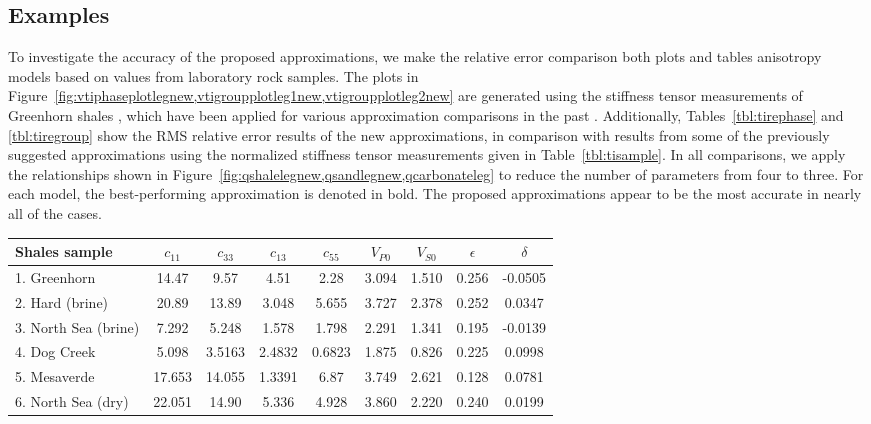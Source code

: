 \subsection{Examples}

To investigate the accuracy of the proposed approximations, we make the relative error comparison  both plots and tables  anisotropy models based on values from laboratory rock samples. 
The plots in Figure~\ref{fig:vtiphaseplotlegnew,vtigroupplotleg1new,vtigroupplotleg2new} are generated using the stiffness tensor measurements of Greenhorn shales \cite[]{jw}, which have been applied for various approximation comparisons in the past \cite[e.g.][]{joethesis,fomel,stovas2010,farra}. 
Additionally, Tables~\ref{tbl:tirephase} and \ref{tbl:tiregroup} show the RMS relative error results of the new approximations, in comparison with results from some of the previously suggested approximations using the normalized stiffness tensor measurements given in Table~\ref{tbl:tisample}.  In all comparisons, we apply the relationships shown in Figure~\ref{fig:qshalelegnew,qsandlegnew,qcarbonateleg} to reduce the number of parameters from four to three.
For each model, the best-performing approximation is denoted in  bold. The proposed approximations appear to be the most accurate in nearly all of the cases.

{
\centering
     	     \begin{tabular}{|l|c|c|c|c|c|c|c|c|}
     	     \hline Shales sample & $ c_{11}$ & $ c_{33}$ & $ c_{13}$ & $ c_{55} $ & $ V_{P0}$ & $ V_{S0}$ & $ \epsilon $ & $ \delta $\\ 
     	     \hline 1. Greenhorn  & 14.47 & 9.57 & 4.51 & 2.28 & 3.094 & 1.510 & 0.256 & -0.0505\\
     	     \hline 2. Hard (brine) & 20.89 & 13.89 & 3.048 & 5.655 & 3.727 & 2.378 & 0.252 & 0.0347\\
     	     \hline 3. North Sea (brine) & 7.292 & 5.248 & 1.578 & 1.798 & 2.291 & 1.341 & 0.195 & -0.0139\\
     	     \hline 4. Dog Creek & 5.098 & 3.5163 & 2.4832 & 0.6823 & 1.875 & 0.826 & 0.225 & 0.0998\\
     	     \hline 5. Mesaverde & 17.653 & 14.055 & 1.3391 & 6.87 & 3.749 & 2.621 & 0.128 & 0.0781\\
     	     \hline 6. North Sea (dry) & 22.051 & 14.90 & 5.336 & 4.928 & 3.860 & 2.220 & 0.240 & 0.0199\\
      \hline
    \end{tabular}
}

